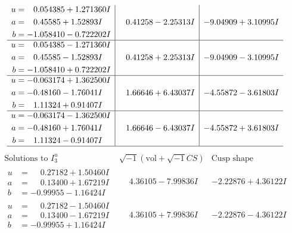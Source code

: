 \documentclass[1p]{elsarticle_modified}
\theoremstyle{definition}
\newcommand{\I}{\sqrt{-1}}
\begin{document}
$$\begin{array}{c|c|c}
\begin{aligned}
u &= \phantom{-}0.054385 + 1.271360 I \\
a &= \phantom{-}0.45585 + 1.52893 I \\
b &= -1.058410 - 0.722202 I\end{aligned}
 & \phantom{-}0.41258 - 2.25313 I & -9.04909 + 3.10995 I \\ \hline\begin{aligned}
u &= \phantom{-}0.054385 - 1.271360 I \\
a &= \phantom{-}0.45585 - 1.52893 I \\
b &= -1.058410 + 0.722202 I\end{aligned}
 & \phantom{-}0.41258 + 2.25313 I & -9.04909 - 3.10995 I \\ \hline\begin{aligned}
u &= -0.063174 + 1.362500 I \\
a &= -0.48160 - 1.76041 I \\
b &= \phantom{-}1.11324 + 0.91407 I\end{aligned}
 & \phantom{-}1.66646 + 6.43037 I & -4.55872 - 3.61803 I \\ \hline\begin{aligned}
u &= -0.063174 - 1.362500 I \\
a &= -0.48160 + 1.76041 I \\
b &= \phantom{-}1.11324 - 0.91407 I\end{aligned}
 & \phantom{-}1.66646 - 6.43037 I & -4.55872 + 3.61803 I\\
 \hline 
 \end{array}$$\newpage$$\begin{array}{c|c|c}  
\text{Solutions to }I^u_{3}& \I (\text{vol} + \sqrt{-1}CS) & \text{Cusp shape}\\
 \hline 
\begin{aligned}
u &= \phantom{-}0.27182 + 1.50460 I \\
a &= \phantom{-}0.13400 + 1.67219 I \\
b &= -0.99955 - 1.16424 I\end{aligned}
 & \phantom{-}4.36105 - 7.99836 I & -2.22876 + 4.36122 I \\ \hline\begin{aligned}
u &= \phantom{-}0.27182 - 1.50460 I \\
a &= \phantom{-}0.13400 - 1.67219 I \\
b &= -0.99955 + 1.16424 I\end{aligned}
 & \phantom{-}4.36105 + 7.99836 I & -2.22876 - 4.36122 I \\ \hline\begin{aligned}

\end{aligned}
\end{array}$$
\end{document}
